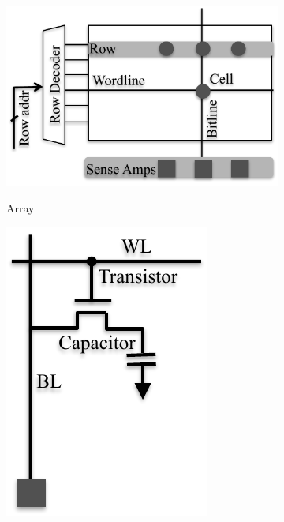 \begin{figure}
 \centering
  \begin{subfigure}{.36\textwidth}
    \centering
    	\includegraphics[width=\linewidth]{figures/dram_array.pdf}\\
    \caption{Array}
    \label{fig:dram_array}
  \end{subfigure}
%
  \begin{subfigure}{.16\textwidth}
    \centering
    	\includegraphics[width=\linewidth]{figures/dram_cell.pdf}\\

\end{subfigure}
\end{figure}
